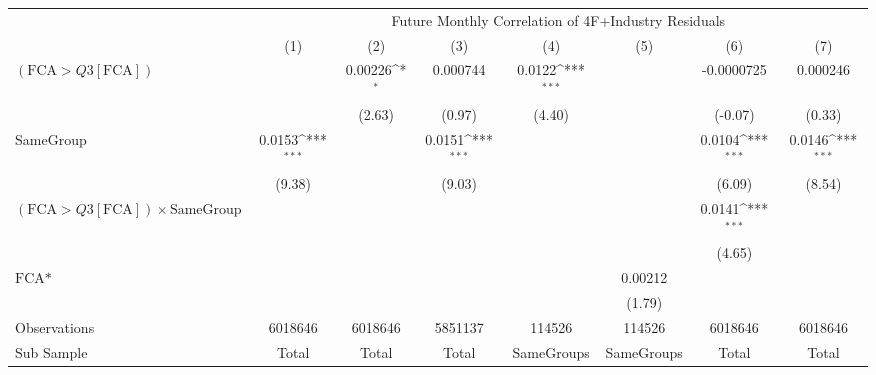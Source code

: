 {
\def\sym#1{\ifmmode^{#1}\else\(^{#1}\)\fi}
\begin{tabular}{l*{7}{c}}
\hline\hline
                &\multicolumn{7}{c}{Future Monthly Correlation of 4F+Industry Residuals}                                                             \\\cmidrule(lr){2-8}
                &\multicolumn{1}{c}{(1)}         &\multicolumn{1}{c}{(2)}         &\multicolumn{1}{c}{(3)}         &\multicolumn{1}{c}{(4)}         &\multicolumn{1}{c}{(5)}         &\multicolumn{1}{c}{(6)}         &\multicolumn{1}{c}{(7)}         \\
\hline
 $ (\text{FCA} > Q3[\text{FCA}]) $ &                  &  0.00226\sym{*}  & 0.000744         &   0.0122\sym{***}&                  &-0.0000725         & 0.000246         \\
                &                  &   (2.63)         &   (0.97)         &   (4.40)         &                  &  (-0.07)         &   (0.33)         \\
[1em]
SameGroup       &   0.0153\sym{***}&                  &   0.0151\sym{***}&                  &                  &   0.0104\sym{***}&   0.0146\sym{***}\\
                &   (9.38)         &                  &   (9.03)         &                  &                  &   (6.09)         &   (8.54)         \\
[1em]
 $ (\text{FCA} > Q3[\text{FCA}]) \times  {\text{SameGroup} }  $ &                  &                  &                  &                  &                  &   0.0141\sym{***}&                  \\
                &                  &                  &                  &                  &                  &   (4.65)         &                  \\
[1em]
$ \text{FCA*} $ &                  &                  &                  &                  &  0.00212         &                  &                  \\
                &                  &                  &                  &                  &   (1.79)         &                  &                  \\
\hline
Observations    &  6018646         &  6018646         &  5851137         &   114526         &   114526         &  6018646         &  6018646         \\
Sub Sample      &    Total         &    Total         &    Total         &SameGroups         &SameGroups         &    Total         &    Total         \\

\end{tabular}}
